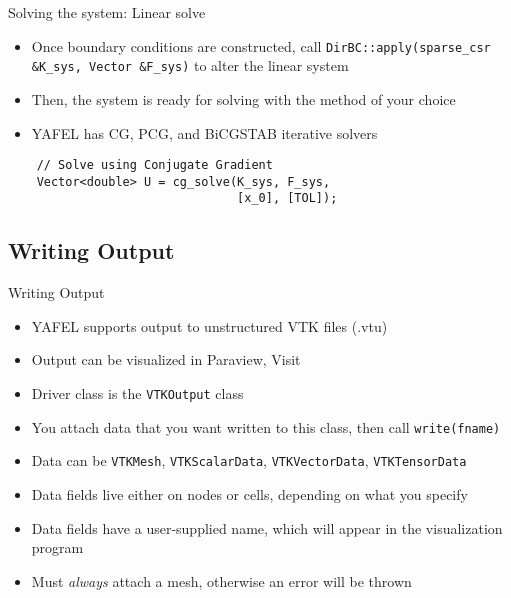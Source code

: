 \begin{frame}[fragile]{Solving the system: Linear solve}
  \begin{itemize}
  \item
    Once boundary conditions are constructed, call
    \texttt{DirBC::apply(sparse\_csr \&K\_sys, Vector \&F\_sys)}
    to alter the linear system
  \item
    Then, the system is ready for solving with the method of your choice
  \item
    YAFEL has CG, PCG, and BiCGSTAB iterative solvers
  \end{itemize}
  \begin{lstlisting}
    // Solve using Conjugate Gradient
    Vector<double> U = cg_solve(K_sys, F_sys, 
                                [x_0], [TOL]);
  \end{lstlisting}
\end{frame}

\subsection{Writing Output}

\begin{frame}{Writing Output}
  
  \begin{itemize}
  \item
    YAFEL supports output to unstructured VTK files (.vtu)
  \item
    Output can be visualized in Paraview, Visit
  \item
    Driver class is the \texttt{VTKOutput} class
  \item
    You attach data that you want written to this class, then call \texttt{write(fname)}
  \item
    Data can be \texttt{VTKMesh}, 
    \texttt{VTKScalarData}, 
    \texttt{VTKVectorData}, 
    \texttt{VTKTensorData}
  \item
    Data fields live either on nodes or cells, depending on what you specify
  \item
    Data fields have a user-supplied name, which will appear in the visualization program
  \item
    Must \emph{always} attach a mesh, otherwise an error will be thrown
  \end{itemize}

\end{frame}

